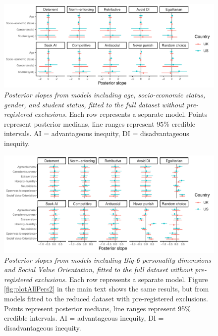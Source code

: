 \documentclass[
  man, donotrepeattitle,floatsintext]{apa6}
\begin{document}
\newpage







\begin{figure}
\centering
\includegraphics{manuscript_files/figure-latex/plotAllDems1-1.pdf}
\caption{\label{fig:plotAllDems1}\emph{Posterior slopes from models including age,
socio-economic status, gender, and student status, fitted to the full dataset
without pre-registered exclusions.} Each row represents a separate model. Points
represent posterior medians, line ranges represent 95\% credible intervals. AI =
advantageous inequity, DI = disadvantageous inequity.}
\end{figure}

\newpage









\begin{figure}
\centering
\includegraphics{manuscript_files/figure-latex/plotAllPers1-1.pdf}
\caption{\label{fig:plotAllPers1}\emph{Posterior slopes from models including Big-6
personality dimensions and Social Value Orientation, fitted to the full dataset
without pre-registered exclusions.} Each row represents a separate model. Figure
\ref{fig:plotAllPers2} in the main text shows the same results, but from models
fitted to the reduced dataset with pre-registered exclusions. Points represent
posterior medians, line ranges represent 95\% credible intervals. AI =
advantageous inequity, DI = disadvantageous inequity.}
\end{figure}
\end{document}
